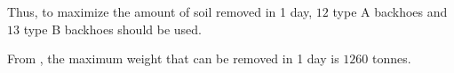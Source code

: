 \begin{subquestions}
\begin{subsubquestions}
Thus, to maximize the amount of soil removed in 1 day, $12$ type A backhoes and $13$ type B backhoes should be used.


\subsubquestion

From , the maximum weight that can be removed in 1 day is $1260$ tonnes.

\end{subsubquestions}

\end{subquestions}

